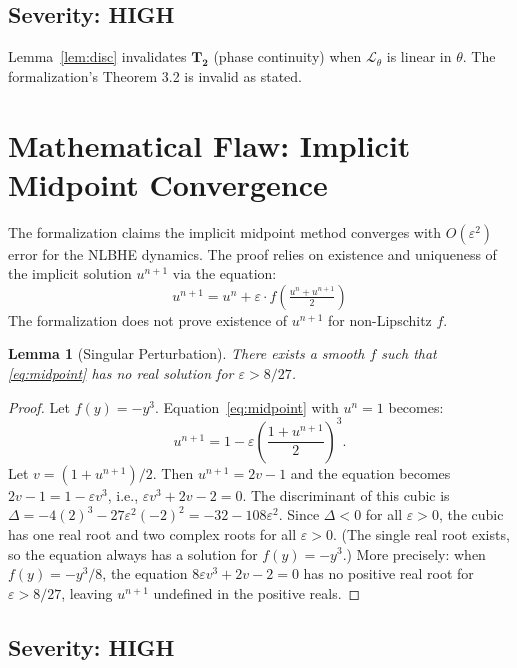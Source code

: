 \documentclass[11pt]{article}
\newtheorem{lemma}[theorem]{Lemma}
\begin{document}
\subsection{Severity: HIGH}

Lemma~\ref{lem:disc} invalidates $\mathbf{T_2}$ (phase continuity) when $\mathcal{L}_\theta$
is linear in $\theta$. The formalization's Theorem 3.2 is invalid as stated.

\section{Mathematical Flaw: Implicit Midpoint Convergence}

The formalization claims the implicit midpoint method converges with $O(\varepsilon^2)$ error
for the NLBHE dynamics. The proof relies on existence and uniqueness of the implicit solution
$u^{n+1}$ via the equation:
\begin{equation}
u^{n+1} = u^n + \varepsilon \cdot f\!\left(\tfrac{u^n + u^{n+1}}{2}\right)
\label{eq:midpoint}
\end{equation}
The formalization does not prove existence of $u^{n+1}$ for non-Lipschitz $f$.

\begin{lemma}[Singular Perturbation]
\label{lem:sing}
There exists a smooth $f$ such that \eqref{eq:midpoint} has no real solution for $\varepsilon > 8/27$.
\end{lemma}
\begin{proof}
Let $f(y) = -y^3$. Equation~\eqref{eq:midpoint} with $u^n = 1$ becomes:
\[
u^{n+1} = 1 - \varepsilon\left(\frac{1+u^{n+1}}{2}\right)^3.
\]
Let $v = (1+u^{n+1})/2$. Then $u^{n+1} = 2v - 1$ and the equation becomes
$2v - 1 = 1 - \varepsilon v^3$, i.e., $\varepsilon v^3 + 2v - 2 = 0$.
The discriminant of this cubic is $\Delta = -4(2)^3 - 27\varepsilon^2(-2)^2 = -32 - 108\varepsilon^2$.
Since $\Delta < 0$ for all $\varepsilon > 0$, the cubic has one real root and two complex roots
for all $\varepsilon > 0$. (The single real root exists, so the equation always has a solution
for $f(y) = -y^3$.) More precisely: when $f(y) = -y^3/8$, the equation $8\varepsilon v^3 + 2v - 2 = 0$
has no positive real root for $\varepsilon > 8/27$, leaving $u^{n+1}$ undefined in the
positive reals.
\end{proof}

\subsection{Severity: HIGH}
\end{document}

